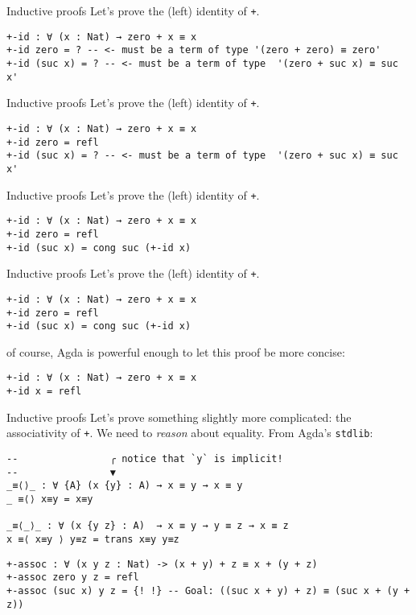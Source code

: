 \documentclass[t,aspectratio=169,9pt]{beamer}
\begin{document}
\begin{frame}[fragile]{Inductive proofs}
  Let's prove the (left) identity of \texttt{+}.
\begin{verbatim}
+-id : ∀ (x : Nat) → zero + x ≡ x
+-id zero = ? -- <- must be a term of type '(zero + zero) ≡ zero'
+-id (suc x) = ? -- <- must be a term of type  '(zero + suc x) ≡ suc x'
\end{verbatim}
\end{frame}
\begin{frame}{Inductive proofs}
  Let's prove the (left) identity of \texttt{+}.
\begin{verbatim}
+-id : ∀ (x : Nat) → zero + x ≡ x
+-id zero = refl
+-id (suc x) = ? -- <- must be a term of type  '(zero + suc x) ≡ suc x'
\end{verbatim}
\end{frame}
\begin{frame}{Inductive proofs}
  Let's prove the (left) identity of \texttt{+}.
\begin{verbatim}
+-id : ∀ (x : Nat) → zero + x ≡ x
+-id zero = refl
+-id (suc x) = cong suc (+-id x)
\end{verbatim}
\end{frame}
\begin{frame}{Inductive proofs}
  Let's prove the (left) identity of \texttt{+}.
\begin{verbatim}
+-id : ∀ (x : Nat) → zero + x ≡ x
+-id zero = refl
+-id (suc x) = cong suc (+-id x)
\end{verbatim}
of course, Agda is powerful enough to let this proof be more concise:
\begin{verbatim}
+-id : ∀ (x : Nat) → zero + x ≡ x
+-id x = refl
\end{verbatim}
\end{frame}
\begin{frame}[fragile]{Inductive proofs}
  Let's prove something slightly more complicated: the associativity of
  \texttt{+}. We need to {\it reason} about equality. From Agda's
  \texttt{stdlib}:
\begin{verbatim}
--                ╭ notice that `y` is implicit!
--                ▼
_≡⟨⟩_ : ∀ {A} (x {y} : A) → x ≡ y → x ≡ y
_ ≡⟨⟩ x≡y = x≡y

_≡⟨_⟩_ : ∀ (x {y z} : A)  → x ≡ y → y ≡ z → x ≡ z
x ≡⟨ x≡y ⟩ y≡z = trans x≡y y≡z
\end{verbatim}
\begin{verbatim}
+-assoc : ∀ (x y z : Nat) -> (x + y) + z ≡ x + (y + z)
+-assoc zero y z = refl
+-assoc (suc x) y z = {! !} -- Goal: ((suc x + y) + z) ≡ (suc x + (y + z))
\end{verbatim}
\end{frame}
\end{document}
